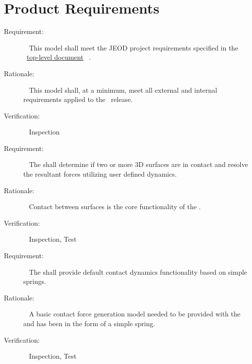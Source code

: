 %
%
%  
%


\chapter{Product Requirements}\label{ch:reqt}
\label{reqt:jeod}
  \begin{description}
  \item[Requirement:]\ \newline
  This model shall meet the JEOD project requirements specified in the \JEODid\
  \hyperref{file:\JEODHOME/docs/JEOD.pdf}{part1}{reqt}{top-level document}~\cite{dynenv:JEOD} .
  \item[Rationale:]\ \newline
  This model shall, at a minimum, meet all external and internal requirements applied to the
  \JEODid\ release.
  \item[Verification:]\ \newline
  Inspection
  \end{description}

\label{reqt:Contact_Surfaces}
\begin{description}
  \item[Requirement:]\ \newline
     The \ModelDesc shall determine if two or more 3D surfaces are in contact and resolve the
     resultant forces utilizing user defined dynamics.
  \item[Rationale:]\ \newline
     Contact between surfaces is the core functionality of the \ModelDesc.
  \item[Verification:]\ \newline
    Inspection, Test
\end{description}

\label{reqt:Contact_Spring_Default}
\begin{description}
  \item[Requirement:]\ \newline
     The \ModelDesc shall provide default contact dynamics functionality based on simple springs.
  \item[Rationale:]\ \newline
     A basic contact force generation model needed to be provided with the \ModelDesc and has been in
     the form of a simple spring.
  \item[Verification:]\ \newline
    Inspection, Test
\end{description}

